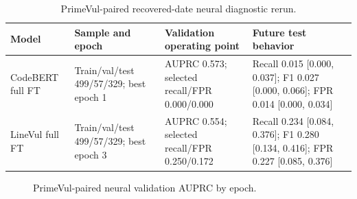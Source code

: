 \documentclass[a4paper,fleqn]{cas-dc}
\begin{document}
\begin{table}
\centering
\caption{PrimeVul-paired recovered-date neural diagnostic rerun.}
\label{tab:primevul-neural}
\small
\setlength{\tabcolsep}{4pt}
\begin{tabular}{p{}p{}p{}p{}}
\toprule
Model & Sample and epoch & Validation operating point & Future test behavior \\
\midrule
CodeBERT full FT & Train/val/test 499/57/329; best epoch 1 &
AUPRC 0.573; selected recall/FPR 0.000/0.000 &
Recall 0.015 [0.000, 0.037]; F1 0.027 [0.000, 0.066]; FPR 0.014 [0.000, 0.034] \\
LineVul full FT & Train/val/test 499/57/329; best epoch 3 &
AUPRC 0.554; selected recall/FPR 0.250/0.172 &
Recall 0.234 [0.084, 0.376]; F1 0.280 [0.134, 0.416]; FPR 0.227 [0.085, 0.376] \\
\bottomrule
\end{tabular}
\end{table}

\begin{figure}
  \centering
  \caption{PrimeVul-paired neural validation AUPRC by epoch.}
  \label{fig:primevul-training}
\end{figure}
\end{document}
